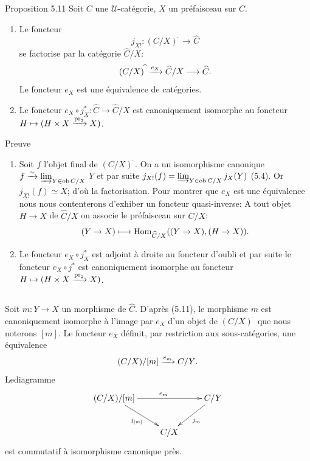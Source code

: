 \documentclass[10pt]{../fichiers-configuration-latex/smfart}
\def\labelenumi{(\theenumi)}
\begin{document}
\begin{enonce*}{Proposition 5.11}
Soit $C$ une $𝒰$-catégorie, $X$ un préfaisceau sur $C$.
\begin{enumerate}
\renewcommand{\labelenumi}{\theenumi)}
\item Le foncteur
$$
j_{X!}:(C/X)^{\widehat{\phantom{,}}}\longrightarrow
\widehat{C}
$$
se factorise par la catégorie $\widehat{C}/X$:
$$
(C/X)^{\widehat{\phantom{,}}}\xrightarrow{e_X}
\widehat{C}/X\longrightarrow
\widehat{C}{}.
$$
Le foncteur $e_X$ est une équivalence de catégories.

\item Le foncteur $e_{X}\circ j^\ast_X:\widehat{C}
\to  \widehat{C}/X$ est canoniquement isomorphe au
foncteur
  $H\mapsto (H\times X \xrightarrow{\operatorname{pr}_2} X)$.
\end{enumerate}
\end{enonce*}

\begin{enonce*}[remark]{Preuve}
\begin{enumerate}
\renewcommand{\labelenumi}{\theenumi)}
\item Soit $f$ l'objet final de $(C/X)^{\widehat{\phantom{,}}}$. On a
  un isomorphisme canonique $f\xrightarrow{\sim} \varinjlim_{Y\in
  \operatorname{ob} C/X}$ $Y$ et par suite $j_{X!}(f)=\varinjlim_{Y\in
  \operatorname{ob} C/X} j_X(Y)$ (5.4). Or $j_{X!}(f)\simeq X$; d'où la
  factorisation. Pour montrer que $e_X$ est une équivalence nous
  nous contenterons d'exhiber un foncteur quasi-inverse: A tout objet
  $H\rightarrow X$ de $\widehat{C}/X$ on associe le
  préfaisceau sur $C/X$:
$$
(Y\rightarrow X)\longmapsto
  \operatorname{Hom}_{\widehat{C}/X}((Y\rightarrow X), (H\rightarrow
  X)){}.
$$

\item Le foncteur $e_X\circ j^\ast_X$ est adjoint à droite au
  foncteur d'oubli et par suite le foncteur $e_X\circ j^\ast$ est
  canoniquement isomorphe au foncteur $H\mapsto (H\times
  X\xrightarrow{\operatorname{pr}_2}X)$.
\end{enumerate}
\end{enonce*}

\setcounter{subsection}{11}
\subsection{}
Soit $m:Y\rightarrow X$ un morphisme de $\widehat{C}$.
D'après (5.11), le morphisme $m$ est canoniquement isomorphe à
l'image par $e_X$ d'un objet de $(C/X)^{\widehat{\phantom{,}}}$ que
nous noterons $[m]$. Le foncteur $e_X$ définit, par restriction aux
sous-catégories, une équivalence
$$
(C/X)/[m]\xrightarrow{e_m}C/Y{}.
$$
Le\pageoriginale diagramme
\[
\xymatrix{
  (C/X)/[m]\ar[rr]^{e_m} \ar[rd]_{j_{[m]}} &       & C/Y \ar[ld]^{j_m}\\
          & C/X   &
}
\]
est commutatif à isomorphisme canonique près.
\end{document}

